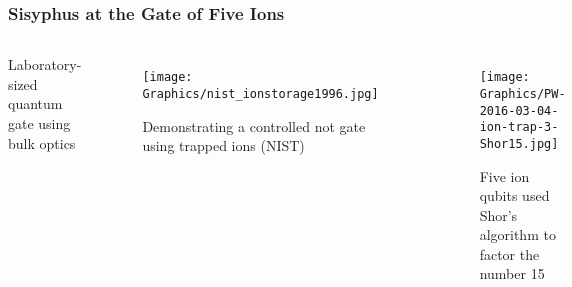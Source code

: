 
\begin{frame}
  \frametitle{Sisyphus at the Gate of Five Ions}
  \begin{columns}
    Laboratory-sized quantum gate using bulk optics 
    \begin{figure}
      \centering
      \texttt{[image: Graphics/nist\_ionstorage1996.jpg]}      
      \caption{Demonstrating a controlled not gate using trapped
        ions (NIST)~\cite{NIST-Q-Logic-Gates}}
    \end{figure}
    
    \begin{figure}
      \centering
    \texttt{[image: Graphics/PW-2016-03-04-ion-trap-3-Shor15.jpg]}
      
      \caption{Five ion qubits used Shor's algorithm to factor the number
        15~\cite{PW-Shor-factor-15}}
    \end{figure}
  \end{columns}

\end{frame}
